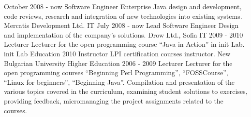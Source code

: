 
{
  October 2008 - now
}
{
  Software Engineer
}
{
  Enterprise Java design and development, code reviews, research and
  integration of new technologies into existing systems.
}
{
  Mercatis Development Ltd.
}
{
  IT
}
\ecvitem{}{} %
\ecvitem{}{} %
{
  July 2008 - now
}
{
  Lead Software Engineer
}
{
  Design and implementation of the company's solutions.
}
{
  Drow Ltd., Sofia
}
{
  IT
}
\ecvitem{}{} %
\ecvitem{}{} %
{
  2009 - 2010
}
{
  Lecturer
}
{
  Lecturer for the open programming course
  ``Java in Action'' in init Lab.
}
{
  init Lab
}
{
  Education
}
\ecvitem{}{} %
\ecvitem{}{} %
{
  2010
}
{
  Instructor
}
{
  LPI certification courses instructor.
}
{
  New Bulgarian University
}
{
  Higher Education
}
\ecvitem{}{} %
\ecvitem{}{} %
{
  2006 - 2009
}
{
  Lecturer
}
{
  Lecturer for the open programming courses
  ``Beginning Perl Programming'', ``FOSSCourse'', ``Linux for
  beginners'', ``Beginning Java''. Compilation and presentation of the various topics covered in
  the curriculum, examining student solutions to exercises, providing
  feedback, micromanaging the project assignments related to the courses.
}

